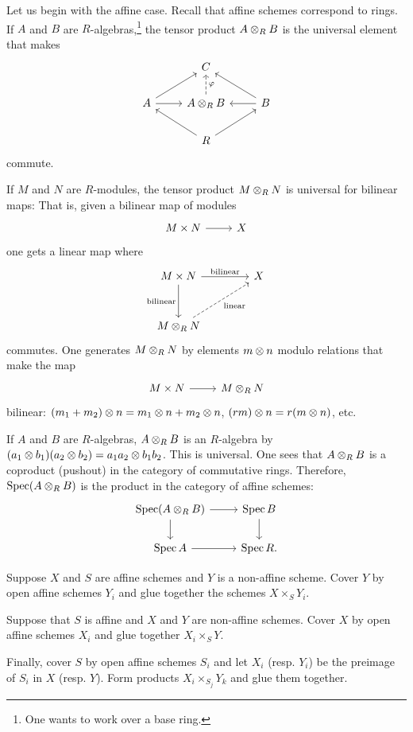 \documentclass [11 pt, oneside] {article}
\begin{document}
Let us begin with the affine case.
Recall that affine schemes correspond to rings. 
If $A$ and $B$ are $R$-algebras,\footnote{One wants to work over a base ring.} the tensor product $A\otimes_R B$ is the universal element that makes
\[
\begin{tikzcd}
	&C \\
	A\ar[ur] \ar[r]& A\tensor_R B\ar[u,dashed,swap,"\varphi"] & B\ar[l]\ar[ul]\\
		 & R \ar[ur]\ar[ul]
\end{tikzcd}
\]
commute.

If $M$ and $N$ are $R$-modules, the tensor product $M\otimes_R N$ is universal for bilinear maps: That is, given a bilinear map of modules
\[
\begin{tikzcd}
M\times N\ar[r]&X
\end{tikzcd}
\]
one gets a linear map where
\[
\begin{tikzcd}[column sep = 4 em, row sep = 3 em]
	M\times N \ar[r, "\textrm{bilinear}"]\ar[d,swap,"\textrm{bilinear}"]& X\\
	M\tensor_R N \ar[ur,swap,dashed,"\textrm{linear}"]
\end{tikzcd}
\]
commutes. One generates $M\otimes_R N$ by elements $m\otimes n$ modulo relations that make the map 
\[
\begin{tikzcd}
M\times N\ar[r]& M\tensor_R N
\end{tikzcd}
\]
bilinear: $(m_1+m_2)\otimes n = m_1\otimes n + m_2\otimes n$, $(rm)\otimes n = r (m\otimes n)$, etc.

If $A$ and $B$ are $R$-algebras, $A\otimes_R B$ is an $R$-algebra by $(a_1\otimes b_1)(a_2\otimes b_2)=a_1a_2\otimes b_1b_2$. This is universal. One sees that $A\otimes_R B$ is a coproduct (pushout) in the category of commutative rings. Therefore, $\operatorname{Spec} (A\otimes_R B)$ is the product in the category of affine schemes:
\[
\begin{tikzcd}
	\Spec (A\tensor_R B)\ar[r]\ar[d] & \Spec B\ar[d]\\
	\Spec A\ar[r] &\Spec R.
\end{tikzcd}
\]

Suppose $X$ and $S$ are affine schemes and $Y$ is a non-affine scheme. Cover $Y$ by open affine schemes $Y_i$ and glue together the schemes $X\times_S Y_i$. 

Suppose that $S$ is affine and $X$ and $Y$ are non-affine schemes. Cover $X$ by open affine schemes $X_i$ and glue together $X_i \times_S Y$.

Finally, cover $S$ by open affine schemes $S_i$ and let $X_i$ (resp. $Y_i$) be the preimage of $S_i$ in $X$  (resp. $Y$). Form products $X_i\times_{S_j}Y_k$ and glue them together.
\end{document}
